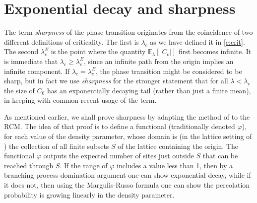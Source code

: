 \documentclass[a4paper,12pt]{scrartcl}
\newcommand{\E}{\mathbb{E}}
\theoremstyle{definition}
\theoremstyle{remark}
\newtheorem{remark}[theorem]{Remark}
\begin{document}
\section{Exponential decay and sharpness} \label{sec:sharp}
The term {\em sharpness} of the phase transition originates from the coincidence of two different definitions of criticality. The first is $\lambda_c$ as
we have defined it in \eqref{e:crit}. The second $\lambda^E_c$ is the point where the quantity $\E_\lambda[|C_o|]$ first becomes infinite. It is immediate that $\lambda_c \geq \lambda_c^E$, since an infinite path from the origin implies an infinite component. If $\lambda_c = \lambda_c^E$, the phase transition might be considered to be sharp, but in fact we use
{\em sharpness} %
for the stronger statement that for all $\lambda < \lambda_c$ the size of
$C_0$ has an exponentially decaying tail (rather than just a finite
mean), in keeping with
common recent usage of the term.

%
As mentioned earlier, we shall prove sharpness by adapting
%
%
the method of  \cite{duminilcopin2015new} to the RCM.
The idea of that proof is to define a functional (traditionally denoted $\varphi$),  for each value of the density parameter,
whose domain is (in the lattice setting of
\cite{duminilcopin2015new}) the collection of all finite
subsets $S$ of the lattice containing the origin.
The functional $\varphi$ outputs
the expected number of sites just outside
$S$ that can be reached through $S$.
If the range of $\varphi$ includes
a value less than 1, then by a  branching process domination
argument one can show exponential decay, while if it does not,
then using the Margulis-Russo formula one can
show the percolation
probability is growing linearly in the density
parameter.
\end{document}
